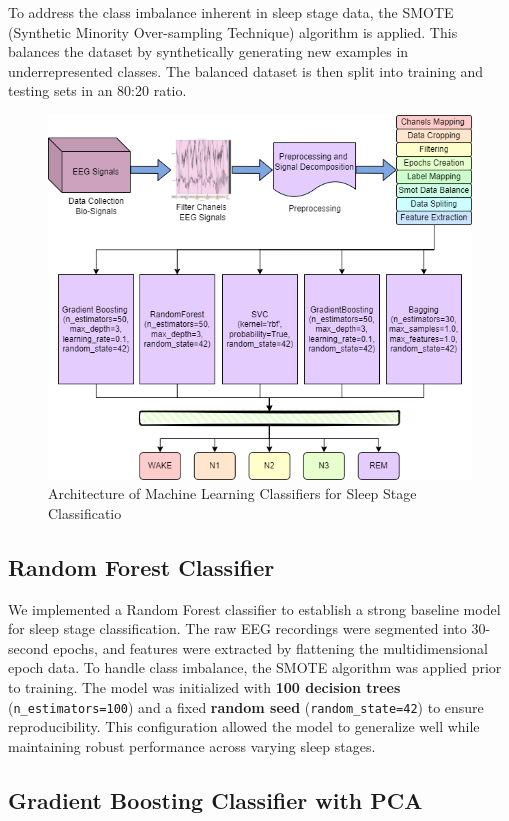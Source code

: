 To address the class imbalance inherent in sleep stage data, the SMOTE (Synthetic Minority Over-sampling Technique) algorithm is applied. This balances the dataset by synthetically generating new examples in underrepresented classes. The balanced dataset is then split into training and testing sets in an 80:20 ratio.  

\begin{figure}
	\centering
	\includegraphics[width=0.7\linewidth]{"img/paper_1/Architechture1"}
	\caption{Architecture of Machine Learning Classifiers for Sleep Stage
		Classificatio}
	\label{fig:architechture1}
\end{figure}







\subsection{Random Forest Classifier}

We implemented a Random Forest classifier to establish a strong baseline model for sleep stage classification. The raw EEG recordings were segmented into 30-second epochs, and features were extracted by flattening the multidimensional epoch data. To handle class imbalance, the SMOTE algorithm was applied prior to training. The model was initialized with \textbf{100 decision trees} (\texttt{n\_estimators=100}) and a fixed \textbf{random seed} (\texttt{random\_state=42}) to ensure reproducibility. This configuration allowed the model to generalize well while maintaining robust performance across varying sleep stages.

\subsection{Gradient Boosting Classifier with PCA}

